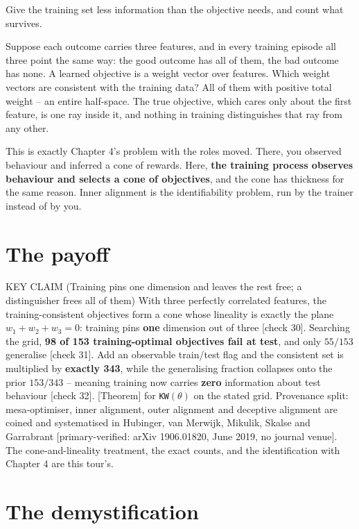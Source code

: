 Give the training set less information than the objective needs, and count what survives.

Suppose each outcome carries three features, and in every training episode all three point the same way: the good outcome has all of them, the bad outcome has none. A learned objective is a weight vector over features. Which weight vectors are consistent with the training data? All of them with positive total weight -- an entire half-space. The true objective, which cares only about the first feature, is one ray inside it, and nothing in training distinguishes that ray from any other.

This is exactly Chapter 4's problem with the roles moved. There, you observed behaviour and inferred a cone of rewards. Here, \textbf{the training process observes behaviour and selects a cone of objectives}, and the cone has thickness for the same reason. Inner alignment is the identifiability problem, run by the trainer instead of by you.

\section*{The payoff}

\begin{whybox}{KEY CLAIM (Training pins one dimension and leaves the rest free; a distinguisher frees all of them)}
With three perfectly correlated features, the training-consistent objectives form a cone whose lineality is exactly the plane $w_1 + w_2 + w_3 = 0$: training pins \textbf{one} dimension out of three [check 30]. Searching the grid, \textbf{98 of 153 training-optimal objectives fail at test}, and only $55/153$ generalise [check 31]. Add an observable train/test flag and the consistent set is multiplied by \textbf{exactly 343}, while the generalising fraction collapses onto the prior $153/343$ -- meaning training now carries \textbf{zero} information about test behaviour [check 32]. [Theorem] for \texttt{KW}$(\theta)$ on the stated grid.
Provenance split: mesa-optimiser, inner alignment, outer alignment and deceptive alignment are coined and systematised in Hubinger, van Merwijk, Mikulik, Skalse and Garrabrant [primary-verified: arXiv 1906.01820, June 2019, no journal venue]. The cone-and-lineality treatment, the exact counts, and the identification with Chapter 4 are this tour's.
\end{whybox}

\section*{The demystification}

